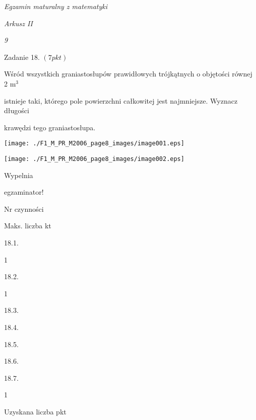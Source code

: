 \documentclass[a4paper,12pt]{article}
\begin{document}
{\it Egzamin maturalny z matematyki}

{\it Arkusz II}

{\it 9}

Zadanie 18. $(7pkt)$

Wśród wszystkich graniastosłupów prawidłowych trójkątnych o objętości równej 2 $\mathrm{m}^{3}$

istnieje taki, którego pole powierzchni całkowitej jest najmniejsze. Wyznacz długości

krawędzi tego graniastosłupa.
\begin{center}
\texttt{[image: ./F1\_M\_PR\_M2006\_page8\_images/image001.eps]}

\texttt{[image: ./F1\_M\_PR\_M2006\_page8\_images/image002.eps]}
\end{center}
Wypelnia

egzaminator!

Nr czynności

Maks. liczba kt

18.1.

1

18.2.

1

18.3.

18.4.

18.5.

18.6.

18.7.

1

Uzyskana liczba pkt
\end{document}
